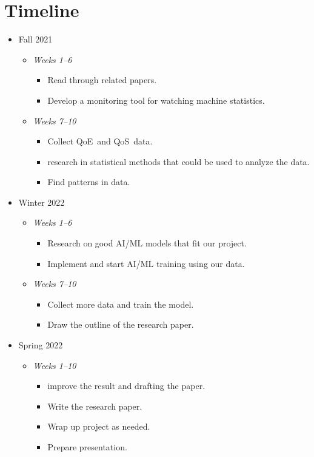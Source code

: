 \section{Timeline}\label{timeline}
\begin{itemize}
    \item Fall 2021 \begin{itemize}
        \item \emph{Weeks 1--6} \begin{itemize}
            \item Read through related papers.
            \item Develop a monitoring tool for watching machine statistics.
        \end{itemize}
        \item \emph{Weeks 7--10} \begin{itemize}
            \item Collect QoE~and QoS~data.
            \item research in statistical methods that could be used to analyze the data.
            \item Find patterns in data.
        \end{itemize}
    \end{itemize}

    \item Winter 2022 \begin{itemize}
        \item \emph{Weeks 1--6} \begin{itemize}
            \item Research on good AI/ML models that fit our project.
            \item Implement and start AI/ML training using our data.
        \end{itemize}
        \item \emph{Weeks 7--10} \begin{itemize}
            \item Collect more data and train the model.
            \item Draw the outline of the research paper.
        \end{itemize}
    \end{itemize}


    \item Spring 2022 \begin{itemize}
        \item \emph{Weeks 1--10} \begin{itemize}
            \item improve the result and drafting the paper.
            \item Write the research paper.
            \item Wrap up project as needed.
            \item Prepare presentation.
        \end{itemize}
    \end{itemize}
\end{itemize}
